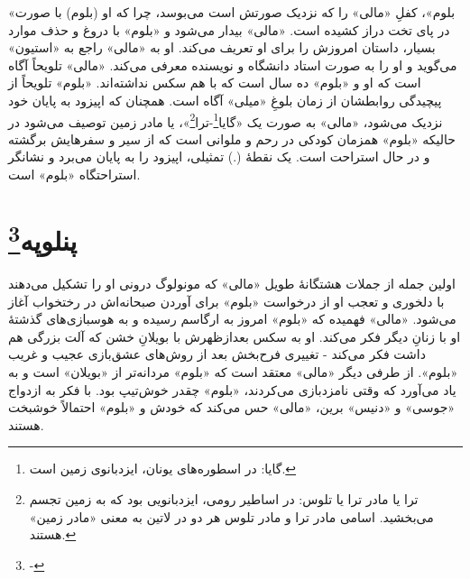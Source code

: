 \documentclass[12pt]{book}
\newcommand{\noun}[1]{«{#1}»}
\begin{document}
    \noun{بلوم}، کفلِ \noun{مالی} را که نزدیک صورتش است می‌بوسد، چرا که او (بلوم) با صورت در پای تخت دراز کشیده است. \noun{مالی} بیدار می‌شود و \noun{بلوم} با دروغ و حذف موارد بسیار، داستان امروزش را برای او تعریف می‌کند. او به \noun{مالی} راجع به \noun{استیون} می‌گوید و او را به صورت استاد دانشگاه و نویسنده معرفی می‌کند. \noun{مالی} تلویحاً آگاه است  که او و \noun{بلوم} ده سال است که با هم سکس نداشته‌اند. \noun{بلوم} تلویحاً از پیچیدگی روابطشان از زمان بلوغِ \noun{میلی} آگاه است. همچنان که اپیزود به پایان خود نزدیک می‌شود، \noun{مالی} به صورت یک «گایا\footnote{گایا: در اسطوره‌های یونان، ایزدبانوی زمین است.}-ترا\footnote{ترا یا مادر ترا یا تلوس: در اساطیر رومی، ایزدبانویی بود که به زمین تجسم می‌بخشید. اسامی مادر ترا و مادر تلوس هر دو در لاتین به معنی «مادر زمین» هستند.}»، یا مادر زمین توصیف می‌شود در حالیکه \noun{بلوم} همزمان کودکی در رحم و ملوانی است که از سیر و سفرهایش برگشته و در حال استراحت است. یک نقطۀ (.) تمثیلی، اپیزود را به پایان می‌برد و نشانگر استراحتگاه \noun{بلوم} است.

    \chapter[پنلوپه]{پنلوپه\protect\footnote{-}}\label{ep:18}
    اولین جمله از جملات هشتگانۀ طویل \noun{مالی} که مونولوگ درونی او را تشکیل می‌دهند با دلخوری و تعجب او از درخواست \noun{بلوم} برای آوردن صبحانه‌اش در رختخواب آغاز می‌شود. \noun{مالی} فهمیده که \noun{بلوم} امروز به ارگاسم رسیده و به هوسبازی‌های گذشتۀ او با زنانِ دیگر فکر می‌کند. او به سکس بعدازظهرش با بویلانِ خشن که آلت بزرگی هم داشت فکر می‌کند - تغییری فرح‌بخش بعد از روش‌های عشق‌بازی عجیب و غریب \noun{بلوم}. از طرفی دیگر \noun{مالی} معتقد است که \noun{بلوم} مردانه‌تر از \noun{بویلان} است و به یاد می‌آورد که وقتی نامزدبازی می‌کردند، \noun{بلوم} چقدر خوش‌تیپ بود. با فکر به ازدواج \noun{جوسی} و \noun{دنیس} برین، \noun{مالی} حس می‌کند که خودش و \noun{بلوم} احتمالاً خوشبخت هستند.
\end{document}
